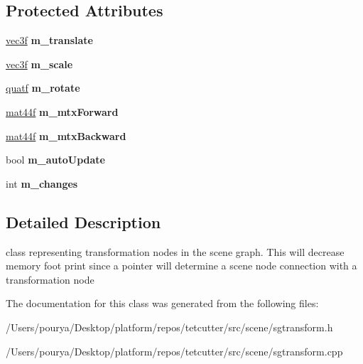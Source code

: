 \subsection*{Protected Attributes}
\begin{DoxyCompactItemize}
\item 
\hypertarget{classps_1_1scene_1_1SGTransform_aed1ae3bec52aabe203bd21637d1789d2}{}\hyperlink{classps_1_1base_1_1Vec3}{vec3f} {\bfseries m\+\_\+translate}\label{classps_1_1scene_1_1SGTransform_aed1ae3bec52aabe203bd21637d1789d2}

\item 
\hypertarget{classps_1_1scene_1_1SGTransform_a4beac68f9c0c76ae4ca6bc48eb2845a8}{}\hyperlink{classps_1_1base_1_1Vec3}{vec3f} {\bfseries m\+\_\+scale}\label{classps_1_1scene_1_1SGTransform_a4beac68f9c0c76ae4ca6bc48eb2845a8}

\item 
\hypertarget{classps_1_1scene_1_1SGTransform_a1c802d8e248b05943273245c835e6736}{}\hyperlink{classps_1_1base_1_1Quaternion}{quatf} {\bfseries m\+\_\+rotate}\label{classps_1_1scene_1_1SGTransform_a1c802d8e248b05943273245c835e6736}

\item 
\hypertarget{classps_1_1scene_1_1SGTransform_ae676fffa86d6f107b0437fbaec777e58}{}\hyperlink{classps_1_1base_1_1Matrix}{mat44f} {\bfseries m\+\_\+mtx\+Forward}\label{classps_1_1scene_1_1SGTransform_ae676fffa86d6f107b0437fbaec777e58}

\item 
\hypertarget{classps_1_1scene_1_1SGTransform_a85627ceda297f9335a8bb8567f7808a6}{}\hyperlink{classps_1_1base_1_1Matrix}{mat44f} {\bfseries m\+\_\+mtx\+Backward}\label{classps_1_1scene_1_1SGTransform_a85627ceda297f9335a8bb8567f7808a6}

\item 
\hypertarget{classps_1_1scene_1_1SGTransform_a115c6333bdbbd4b1847b99d143b2f3bc}{}bool {\bfseries m\+\_\+auto\+Update}\label{classps_1_1scene_1_1SGTransform_a115c6333bdbbd4b1847b99d143b2f3bc}

\item 
\hypertarget{classps_1_1scene_1_1SGTransform_ae94ed6f4ed9e72598e44b2b6e09f9302}{}int {\bfseries m\+\_\+changes}\label{classps_1_1scene_1_1SGTransform_ae94ed6f4ed9e72598e44b2b6e09f9302}

\end{DoxyCompactItemize}


\subsection{Detailed Description}
class representing transformation nodes in the scene graph. This will decrease memory foot print since a pointer will determine a scene node connection with a transformation node 

The documentation for this class was generated from the following files\+:\begin{DoxyCompactItemize}
\item 
/\+Users/pourya/\+Desktop/platform/repos/tetcutter/src/scene/sgtransform.\+h\item 
/\+Users/pourya/\+Desktop/platform/repos/tetcutter/src/scene/sgtransform.\+cpp\end{DoxyCompactItemize}
